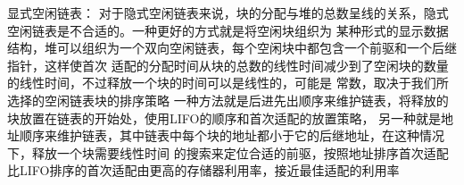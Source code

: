 \documentclass[11pt, a4paper]{article}
\begin{document}
显式空闲链表：
	对于隐式空闲链表来说，块的分配与堆的总数呈线的关系，隐式空闲链表是不合适的。一种更好的方式就是将空闲块组织为
	某种形式的显示数据结构，堆可以组织为一个双向空闲链表，每个空闲块中都包含一个前驱和一个后继指针，这样使首次
	适配的分配时间从块的总数的线性时间减少到了空闲块的数量的线性时间，不过释放一个块的时间可以是线性的，可能是
	常数，取决于我们所选择的空闲链表块的排序策略
	一种方法就是后进先出顺序来维护链表，将释放的块放置在链表的开始处，使用LIFO的顺序和首次适配的放置策略，
	另一种就是地址顺序来维护链表，其中链表中每个块的地址都小于它的后继地址，在这种情况下，释放一个块需要线性时间
	的搜索来定位合适的前驱，按照地址排序首次适配比LIFO排序的首次适配由更高的存储器利用率，接近最佳适配的利用率
\end{document}

